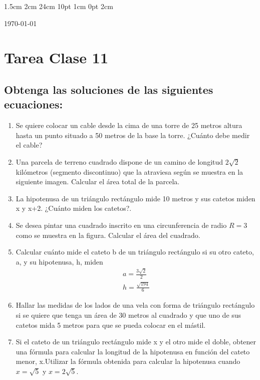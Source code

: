 \documentclass[12pt,letterpaper]{report}
\begin{document}
\setmargins{2.5cm}      
{1.5cm}                     
{2cm}  
{24cm}                    
{10pt}                          
{1cm}                          
{0pt}                             
{2cm}
\begin{flushright}
\today
\end{flushright}
\vspace{-1.75cm}
\section*{Tarea Clase 11}
\subsection*{Obtenga las soluciones de las siguientes ecuaciones:}
\begin{enumerate}
\item Se quiere colocar un cable desde la cima de una torre de 25 metros altura hasta un punto situado a 50 metros de la base la torre. ¿Cuánto debe medir el cable?
\item Una parcela de terreno cuadrado dispone de un camino de longitud $2\sqrt{2}$ kilómetros (segmento discontinuo) que la atraviesa según se muestra en la siguiente imagen. Calcular el área total de la parcela.
\item La hipotenusa de un triángulo rectángulo mide 10 metros y sus catetos miden x y x+2. ¿Cuánto miden los catetos?.
\item Se desea pintar una cuadrado inscrito en una circunferencia de radio 
$R=3$ como se muestra en la figura. Calcular el área del cuadrado.
\item Calcular cuánto mide el cateto b de un triángulo rectángulo si su otro cateto, a, y su hipotenusa, h, miden 
\begin{eqnarray*}
a=\frac{3\sqrt{2}}{2} \\
h=\frac{\sqrt{194}}{6}
\end{eqnarray*}
\item Hallar las medidas de los lados de una vela con forma de triángulo rectángulo si se quiere que tenga un área de 30 metros al cuadrado y que uno de sus catetos mida 5 metros para que se pueda colocar en el mástil.
\item Si el cateto de un triángulo rectángulo mide x y el otro mide el doble, obtener una fórmula para calcular la longitud de la hipotenusa en función del cateto menor, x.Utilizar la fórmula obtenida para calcular la hipotenusa cuando $x=\sqrt{5}$ y $x=2\sqrt{5}.$
\end{enumerate}
\end{document}
